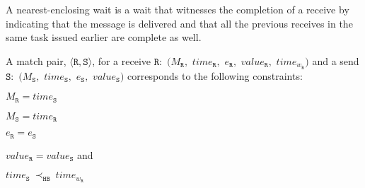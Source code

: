 \begin{definition} \label{def:nw}
A nearest-enclosing wait is a wait that witnesses the completion of a receive by indicating that
the message is delivered and that all the previous receives in the
same task issued earlier are complete as well.
\end{definition}


%

\begin{definition} \label{def:match}
A match pair, $\langle\mathtt{R}, \mathtt{S}\rangle$, for a receive 
$\mathtt{R}:$ $(M_\mathtt{R},$ $\mathit{time}_\mathtt{R},$ $e_\mathtt{R},$ $\mathit{value}_\mathtt{R},$ $\mathit{time}_{\mathit{w}_\mathtt{R}})$ and a send $\mathtt{S}:$ $(M_\mathtt{S},$ $\mathit{time}_\mathtt{S},$ $e_\mathtt{S},$ $\mathit{value}_\mathtt{S})$ corresponds to the following constraints:
\begin{compactenum}
\item $M_{\mathtt{R}} = \mathit{time}_{\mathtt{S}}$
\item $M_{\mathtt{S}} = \mathit{time}_{\mathtt{R}}$
\item $e_{\mathtt{R}} = e_{\mathtt{S}}$
\item $\mathit{value}_{\mathtt{R}} = \mathit{value}_{\mathtt{S}}$ and
\item $\mathit{time}_{\mathtt{S}}\ \mathrm{\prec_\mathtt{HB}}\ \mathit{time}_{\mathit{w}_\mathtt{R}}$
\end{compactenum}
\end{definition}

